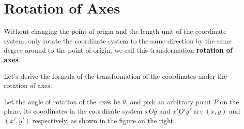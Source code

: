 \documentclass{report}
\begin{document}
\newpage
\section{Rotation of Axes}
Without changing the point of origin and the length unit of the coordinate
system, only rotate the coordinate system to the same direction by the same
degree around to the point of origin, we call this transformation
\textbf{rotation of axes}.

Let's derive the formula of the transformation of the coordinates under the
rotation of axes.

\begin{multicols}{2}
    Let the angle of rotation of the axes be $\theta$, and pick an arbitrary point
    $P$ on the plane, its coordinates in the coordinate system $xOy$ and $x'O'y'$
    are $(x, y)$ and $(x', y')$ respectively, as shown in the figure on the right.


\end{multicols}
\end{document}
